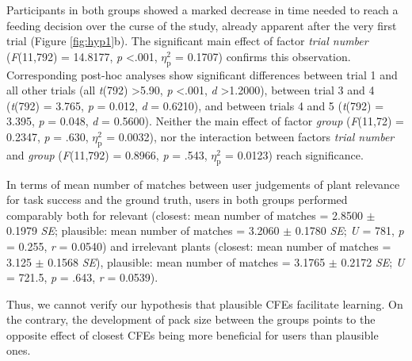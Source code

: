 {Participants in both groups showed a marked decrease in time needed to reach a feeding decision over the curse of the study, already apparent after the very first trial (Figure \ref{fig:hyp1}b).
The significant main effect of factor \textit{trial number} (\textit{F}(11,792) = 14.8177, \textit{p} \textless .001, $\eta_{\text{p}}^{2}$ = 0.1707) confirms this observation.
Corresponding post-hoc analyses show significant differences between trial 1 and all other trials (all \textit{t}(792) \textgreater 5.90, \textit{p} \textless .001, \textit{d} \textgreater 1.2000), between trial 3 and 4 (\textit{t}(792) = 3.765, \textit{p} = 0.012, \textit{d} = 0.6210), and between trials 4 and 5 (\textit{t}(792) = 3.395, \textit{p} = 0.048, \textit{d} = 0.5600).
Neither the main effect of factor \textit{group} (\textit{F}(11,72) = 0.2347, \textit{p} = .630, $\eta_{\text{p}}^{2}$ = 0.0032), nor the interaction between factors \textit{trial number} and \textit{group} (\textit{F}(11,792) = 0.8966, \textit{p} = .543, $\eta_{\text{p}}^{2}$ = 0.0123) reach significance.

In terms of mean number of matches between user judgements of plant relevance for task success and the ground truth, users in both groups performed comparably both for relevant 
(closest: mean number of matches = 2.8500 $\pm$ 0.1979 \textit{SE}; plausible: mean number of matches = 3.2060 $\pm$ 0.1780 \textit{SE}; \textit{U} = 781, \textit{p} = 0.255, \textit{r} = 0.0540)
and irrelevant plants (closest: mean number of matches = 3.125 $\pm$ 0.1568 \textit{SE}), plausible: mean number of matches = 3.1765 $\pm$ 0.2172 \textit{SE}; \textit{U} = 721.5, \textit{p} = .643, \textit{r} = 0.0539).

Thus, we cannot verify our hypothesis that plausible \glspl{CFE} facilitate learning. On the contrary, the development of pack size between the groups points to the opposite effect of closest \glspl{CFE} being more beneficial for users than plausible ones.

}

